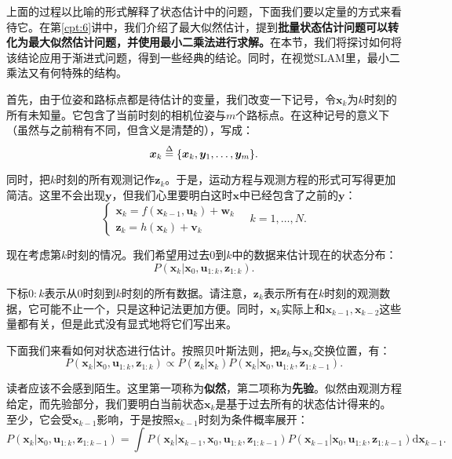上面的过程以比喻的形式解释了状态估计中的问题，下面我们要以定量的方式来看待它。在第\ref{cpt:6}讲中，我们介绍了最大似然估计，提到\textbf{批量状态估计问题可以转化为最大似然估计问题，并使用最小二乘法进行求解。}在本节，我们将探讨如何将该结论应用于渐进式问题，得到一些经典的结论。同时，在视觉SLAM里，最小二乘法又有何特殊的结构。

首先，由于位姿和路标点都是待估计的变量，我们改变一下记号，令$\bm{x}_k$为$k$时刻的所有未知量。它包含了当前时刻的相机位姿与$m$个路标点。在这种记号的意义下（虽然与之前稍有不同，但含义是清楚的），写成：
\begin{equation}
\bm{x}_k  \buildrel \Delta \over =  \{ \bm{x}_k, \bm{y}_1, \ldots, \bm{y}_m \}.
\end{equation}

同时，把$k$时刻的所有观测记作$\bm{z}_k$。于是，运动方程与观测方程的形式可写得更加简洁。这里不会出现$\bm{y}$，但我们心里要明白这时$\bm{x}$中已经包含了之前的$\bm{y}$：
\begin{equation}
\left\{ \begin{array}{l}
{\bm{x}_k} = f\left( {{\bm{x}_{k - 1}},{\bm{u}_k}} \right) + \bm{w}_k \\
{\bm{z}_{k}} = h\left( \bm{x}_k  \right)+ \bm{v}_{k}
\end{array} \right. \quad k=1, \ldots, N .
\end{equation}

现在考虑第$k$时刻的情况。我们希望用过去$0$到$k$中的数据来估计现在的状态分布：
\begin{equation}
P(\bm{x}_k | \bm{x}_0, \bm{u}_{1:k}, \bm{z}_{1:k}).
\end{equation}

下标$0:k$表示从$0$时刻到$k$时刻的所有数据。请注意，$\bm{z}_k$表示所有在$k$时刻的观测数据，它可能不止一个，只是这种记法更加方便。同时，$\bm{x}_k$实际上和$\bm{x}_{k-1}, \bm{x}_{k-2}$这些量都有关，但是此式没有显式地将它们写出来。

下面我们来看如何对状态进行估计。按照贝叶斯法则，把$\bm{z}_k$与$\bm{x}_k$交换位置，有：
\begin{equation}
\label{eq:10-5}
P\left( {{\bm{x}_k}|{\bm{x}_0},{\bm{u}_{1:k}},{\bm{z}_{1:k}}} \right) \propto P\left( {{\bm{z}_k}|{\bm{x}_k}} \right) P\left( {{\bm{x}_k}|{\bm{x}_0},{\bm{u}_{1:k}},{\bm{z}_{1:k - 1}}} \right).
\end{equation}

读者应该不会感到陌生。这里第一项称为\textbf{似然}，第二项称为\textbf{先验}。似然由观测方程给定，而先验部分，我们要明白当前状态$\bm{x}_k$是基于过去所有的状态估计得来的。至少，它会受$\bm{x}_{k-1}$影响，于是按照$\bm{x}_{k-1}$时刻为条件概率展开：
\begin{equation}
\label{eq:bayes-estimator}
P\left( {{\bm{x}_k}|{\bm{x}_0},{\bm{u}_{1:k}},{\bm{z}_{1:k - 1}}} \right) = \int {P\left( {{\bm{x}_k}|{\bm{x}_{k - 1}},{\bm{x}_0},{\bm{u}_{1:k}},{\bm{z}_{1:k - 1}}} \right)P\left( {{\bm{x}_{k - 1}}|{\bm{x}_0},{\bm{u}_{1:k}},{\bm{z}_{1:k - 1}}} \right) \mathrm{d}\bm{x}_{k-1} }.
\end{equation}

